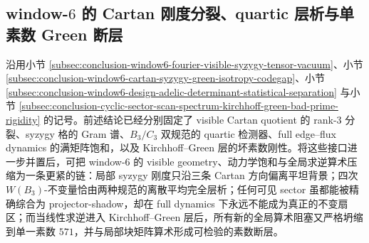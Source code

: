 \subsection{window-\texorpdfstring{$6$}{6} 的 Cartan 刚度分裂、quartic 层析与单素数 Green 断层}\label{subsec:conclusion-window6-cartan-dynamics-green-singleprime-faultline}
沿用小节 \ref{subsec:conclusion-window6-fourier-visible-syzygy-tensor-vacuum}、小节 \ref{subsec:conclusion-window6-cartan-syzygy-green-isotropy-codegap}、小节 \ref{subsec:conclusion-window6-design-adelic-determinant-statistical-separation} 与小节 \ref{subsec:conclusion-cyclic-sector-scan-spectrum-kirchhoff-green-bad-prime-rigidity} 的记号。前述结论已经分别固定了 visible Cartan quotient 的 rank-\(3\) 分裂、syzygy 格的 Gram 谱、\(B_3/C_3\) 双规范的 quartic 检测器、full edge--flux dynamics 的满矩阵饱和，以及 Kirchhoff--Green 层的坏素数刚性。将这些接口进一步并置后，可把 window-\(6\) 的 visible geometry、动力学饱和与全局求逆算术压缩为一条更紧的链：局部 syzygy 刚度只沿三条 Cartan 方向偏离平坦背景；四次 \(W(B_3)\)-不变量恰由两种规范的离散平均完全层析；任何可见 sector 虽都能被精确综合为 projector-shadow，却在 full dynamics 下永远不能成为真正的不变扇区；而当线性求逆进入 Kirchhoff--Green 层后，所有新的全局算术阻塞又严格坍缩到单一素数 \(571\)，并与局部块矩阵算术形成可检验的素数断层。

